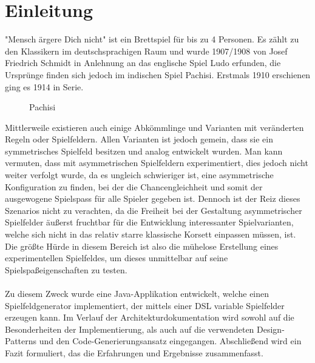 \documentclass[conference]{IEEEtran}
\begin{document}
\section{Einleitung}
"Mensch \"argere Dich nicht" ist ein Brettspiel f\"ur bis zu 4 Personen. Es z\"ahlt zu den Klassikern im deutschsprachigen Raum und wurde 1907/1908 von Josef Friedrich Schmidt in Anlehnung an das englische Spiel Ludo erfunden, die Urspr\"unge finden sich jedoch im indischen Spiel Pachisi. Erstmals 1910 erschienen ging es 1914 in Serie. 
\begin{figure}[]
    \centering
    \caption{Pachisi}
\end{figure}
Mittlerweile existieren auch einige Abk\"ommlinge und Varianten mit ver\"anderten Regeln oder Spielfeldern. Allen Varianten ist jedoch gemein, dass sie ein symmetrisches Spielfeld besitzen und analog entwickelt wurden. Man kann vermuten, dass mit asymmetrischen Spielfeldern experimentiert, dies jedoch
nicht weiter verfolgt wurde, da es ungleich schwieriger ist, eine asymmetrische Konfiguration zu finden, bei der die Chancengleichheit und somit der ausgewogene
Spielspass f\"ur alle Spieler gegeben ist. Dennoch ist der Reiz dieses Szenarios nicht zu verachten, da die Freiheit bei der Gestaltung asymmetrischer Spielfelder
\"au\ss erst fruchtbar f\"ur die Entwicklung interessanter Spielvarianten, welche sich nicht in das relativ starre klassische Korsett einpassen m\"ussen, ist. Die gr\"o\ss te
H\"urde in diesem Bereich ist also die m\"uhelose Erstellung eines experimentellen Spielfeldes, um dieses unmittelbar auf seine Spielspa\ss eigenschaften zu testen.
\\\\
Zu diesem Zweck wurde eine Java-Applikation entwickelt, welche einen Spielfeldgenerator implementiert, der mittels einer DSL variable Spielfelder erzeugen kann. Im Verlauf der Architekturdokumentation wird sowohl auf die Besonderheiten der Implementierung, als auch auf die verwendeten Design-Patterns und den Code-Generierungsansatz eingegangen. Abschlie\ss end wird ein Fazit formuliert, das die Erfahrungen und Ergebnisse zusammenfasst.
\end{document}
